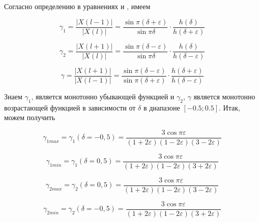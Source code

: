 Согласно определению в уравнениях  и , имеем

\begin{equation}
	\label{eq:equation62}
	\gamma_1 = \frac{\left| X(l-1)\right|}{\left| X(l)\right|} = \frac{\sin \pi({\delta + \varepsilon})}{\sin \pi \delta} \cdot \frac{h(\delta)}{h(\delta + \varepsilon)}
\end{equation}

\begin{equation}
	\label{eq:equation63}
	\gamma_2 = \frac{\left| X(l+1)\right|}{\left| X(l)\right|} = \frac{\sin \pi({\delta - \varepsilon})}{\sin \pi \delta} \cdot \frac{h(\delta)}{h(\delta - \varepsilon)}
\end{equation}

\begin{equation}
	\label{eq:equation64}
	\gamma = \frac{\left| X(l+1)\right|}{\left| X(l-1)\right|} = \frac{\sin \pi({\delta - \varepsilon})}{\sin \pi ({\delta + \varepsilon})} \cdot \frac{h({\delta + \varepsilon})}{h(\delta - \varepsilon)}
\end{equation}

Знаем $\gamma_1$, является монотонно убывающей функцией и $\gamma_2$, $\gamma$ является монотонно возрастающей функцией в зависимости от $\delta$ в диапазоне $[-0.5;0.5]$. Итак, можем получить

\begin{equation}
	\label{eq:equation65}
	\gamma_{1 max} = \gamma_1 (\delta = - 0,5) = \frac{3 \cos \pi \varepsilon}{(1 + 2 \varepsilon)(1 - 2 \varepsilon)(3 - 2 \varepsilon)}
\end{equation}

\begin{equation}
	\label{eq:equation66}
	\gamma_{1 min} = \gamma_1 (\delta = 0,5) = \frac{3 \cos \pi \varepsilon}{(1 + 2 \varepsilon)(1 - 2 \varepsilon)(3 + 2 \varepsilon)}
\end{equation}

\begin{equation}
	\label{eq:equation67}
	\gamma_{2 max} = \gamma_2 (\delta = 0,5) = \frac{3 \cos \pi \varepsilon}{(1 + 2 \varepsilon)(1 - 2 \varepsilon)(3 - 2 \varepsilon)}
\end{equation}

\begin{equation}
	\label{eq:equation68}
	\gamma_{2 min} = \gamma_2 (\delta = -0,5) = \frac{3 \cos \pi \varepsilon}{(1 + 2 \varepsilon)(1 - 2 \varepsilon)(3 + 2 \varepsilon)}
\end{equation}


